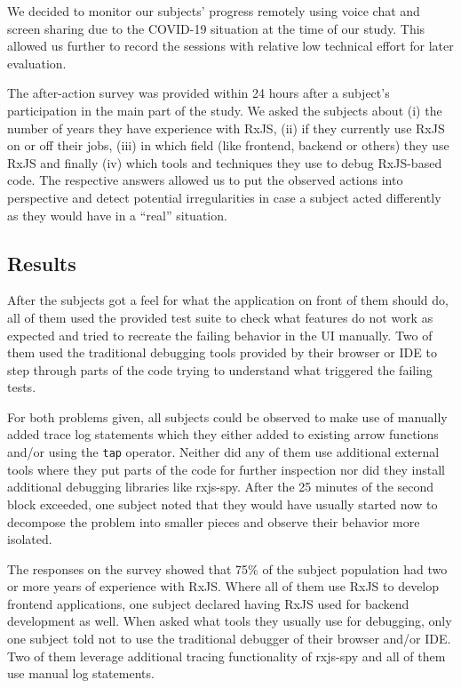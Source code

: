 \documentclass[12pt,a4paper]{article}
\begin{document}
We decided to monitor our subjects' progress remotely using voice chat and screen sharing due to the COVID-19 situation at the time of our study. This allowed us further to record the sessions with relative low technical effort for later evaluation.

The after-action survey was provided within 24 hours after a subject's participation in the main part of the study. We asked the subjects about (i) the number of years they have experience with RxJS, (ii) if they currently use RxJS on or off their jobs, (iii) in which field (like frontend, backend or others) they use RxJS and finally (iv) which tools and techniques they use to debug RxJS-based code. The respective answers allowed us to put the observed actions into perspective and detect potential irregularities in case a subject acted differently as they would have in a ``real'' situation.

\subsection{Results}

After the subjects got a feel for what the application on front of them should do, all of them used the provided test suite to check what features do not work as expected and tried to recreate the failing behavior in the UI manually. Two of them used the traditional debugging tools provided by their browser or IDE to step through parts of the code trying to understand what triggered the failing tests.

For both problems given, all subjects could be observed to make use of manually added trace log statements which they either added to existing arrow functions and/or using the \texttt{tap} operator. Neither did any of them use additional external tools where they put parts of the code for further inspection nor did they install additional debugging libraries like rxjs-spy.
After the 25 minutes of the second block exceeded, one subject noted that they would have usually started now to decompose the problem into smaller pieces and observe their behavior more isolated.

The responses on the survey showed that 75\% of the subject population had two or more years of experience with RxJS. Where all of them use RxJS to develop frontend applications, one subject declared having RxJS used for backend development as well. When asked what tools they usually use for debugging, only one subject told not to use the traditional debugger of their browser and/or IDE. Two of them leverage additional tracing functionality of rxjs-spy and all of them use manual log statements.
\end{document}
